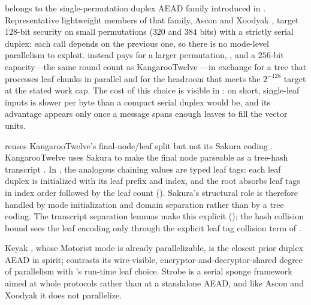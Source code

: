 \TW{} belongs to the single-permutation duplex AEAD family introduced in
\cite{BDPV11}. Representative lightweight members of that family, Ascon
\cite{DEMS21} and Xoodyak \cite{DHPVV20}, target $128$-bit security on small
permutations ($320$ and $384$ bits) with a strictly serial duplex: each call
depends on the previous one, so there is no mode-level parallelism to exploit.
\TW{} instead pays for a larger permutation, \Keccakp, and a $256$-bit
capacity---the same round count as KangarooTwelve \cite{BDPVVV16}---in exchange
for a tree that processes leaf chunks in parallel and for the headroom that
meets the $2^{-128}$ target at the stated work cap. The cost of this choice is
visible in : on short, single-leaf inputs \TW{} is slower
per byte than a compact serial duplex would be, and its advantage appears only
once a message spans enough leaves to fill the vector units.

\TW{} reuses KangarooTwelve's final-node/leaf split but not its Sakura coding
\cite{BDPV14}. KangarooTwelve uses Sakura to make the final node parseable as a
tree-hash transcript \cite{BDPVVV16}. In \TW{}, the analogous chaining values
are typed leaf tags: each leaf duplex is initialized with its leaf prefix and
index, and the root absorbs leaf tags in index order followed by the leaf count
(). Sakura's structural role is therefore
handled by mode initialization and domain separation rather than by a tree
coding. The transcript separation lemmas make this explicit
(); the hash collision bound sees the
leaf encoding only through the explicit leaf tag collision term of
.

Keyak \cite{BDPVV16}, whose Motorist mode is already parallelizable, is the
closest prior duplex AEAD in spirit;  contrasts its
wire-visible, encryptor-and-decryptor-shared degree of parallelism with \TW{}'s
run-time leaf choice.
Strobe \cite{Ham17} is a serial sponge framework aimed at whole protocols rather
than at a standalone AEAD, and like Ascon and Xoodyak it does not parallelize.

